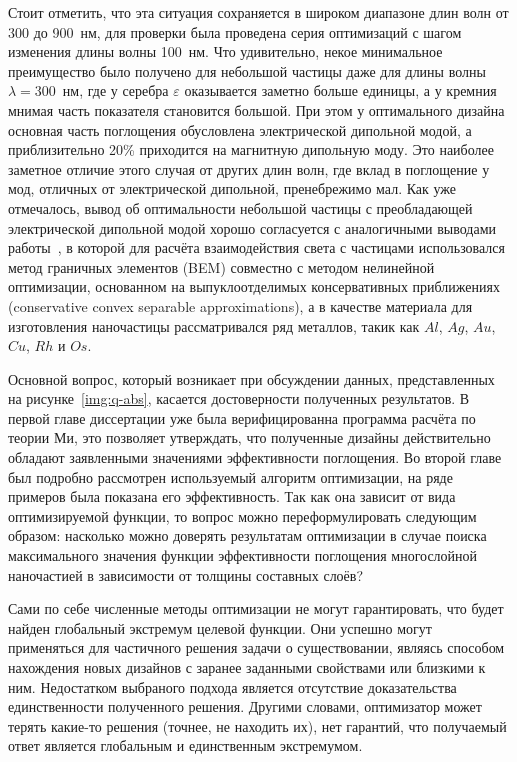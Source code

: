 Стоит отметить, что эта ситуация сохраняется в широком диапазоне длин
волн от 300 до 900~нм, для проверки была проведена серия оптимизаций с
шагом изменения длины волны 100~нм.  Что удивительно, некое
минимальное преимущество было получено для небольшой частицы даже для
длины волны $\lambda=300$~нм, где у серебра $\varepsilon$ оказывается
заметно больше единицы, а у кремния мнимая часть показателя становится
большой. При этом у оптимального дизайна основная часть поглощения
обусловлена электрической дипольной модой, а приблизительно 20\%
приходится на магнитную дипольную моду. Это наиболее заметное отличие
этого случая от других длин волн, где вклад в поглощение у мод,
отличных от электрической дипольной, пренебрежимо мал. Как уже
отмечалось, вывод об оптимальности небольшой частицы с преобладающей
электрической дипольной модой хорошо согласуется с аналогичными
выводами работы~\cite{Miller-2014}, в которой для расчёта
взаимодействия света с частицами использовался метод граничных
элементов (BEM) совместно с методом нелинейной оптимизации, основанном
на выпуклоотделимых консервативных приближениях (conservative convex
separable approximations), а в качестве материала для изготовления
наночастицы рассматривался ряд металлов, такик как $Al$, $Ag$, $Au$,
$Cu$, $Rh$ и $Os$.


Основной вопрос, который возникает при обсуждении данных,
представленных на рисунке~\ref{img:q-abs}, касается достоверности
полученных результатов.  В первой главе диссертации уже была
верифицированна программа расчёта по теории Ми, это позволяет
утверждать, что полученные дизайны действительно обладают заявленными
значениями эффективности поглощения.  Во второй главе был подробно
рассмотрен используемый алгоритм оптимизации, на ряде примеров была
показана его эффективность.  Так как она зависит от вида
оптимизируемой функции, то вопрос можно переформулировать следующим
образом: насколько можно доверять результатам оптимизации в случае
поиска максимального значения функции эффективности поглощения
многослойной наночастией в зависимости от толщины составных слоёв?

Сами по себе численные методы оптимизации не могут гарантировать, что
будет найден глобальный экстремум целевой функции. Они успешно
могут применяться для частичного решения задачи о существовании,
являясь способом нахождения новых дизайнов с заранее заданными
свойствами или близкими к ним.  Недостатком выбраного подхода является
отсутствие доказательства единственности полученного решения.  Другими
словами, оптимизатор может терять какие-то решения (точнее, не
находить их), нет гарантий, что получаемый ответ является глобальным и
единственным экстремумом.

